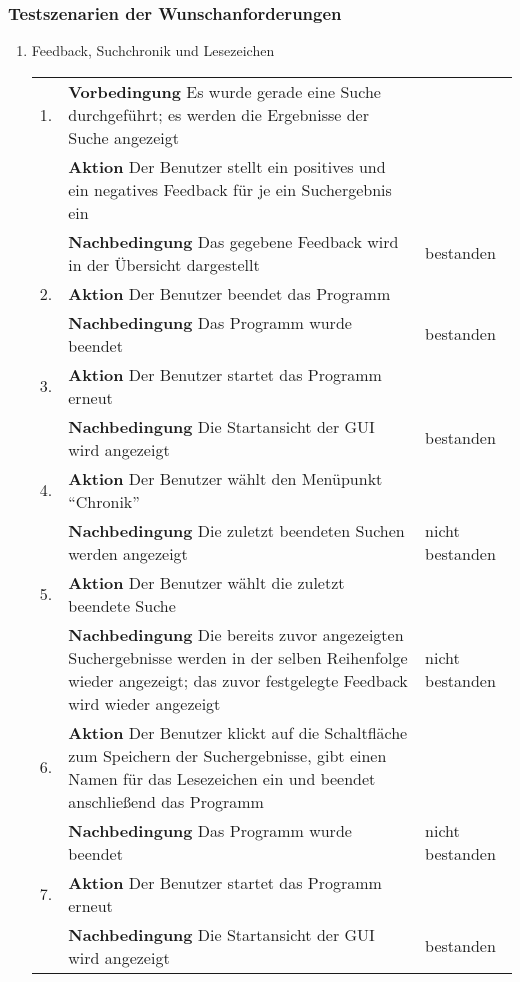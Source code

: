 \subsubsection{Testszenarien der Wunschanforderungen}
\begin{enumerate} [label=\bfseries /TSW \arabic*0/, leftmargin=*]
	\item Feedback, Suchchronik und Lesezeichen \newline \newline
	\begin{tabular}{rp{4in}|l}
	1. & \textbf{Vorbedingung} Es wurde gerade eine Suche durchgeführt; es werden die Ergebnisse der Suche angezeigt & \\
	   & \textbf{Aktion} Der Benutzer stellt ein positives und ein negatives Feedback für je ein Suchergebnis ein & \\
	   & \textbf{Nachbedingung} Das gegebene Feedback wird in der Übersicht dargestellt & bestanden \\
	\hline
	2. & \textbf{Aktion} Der Benutzer beendet das Programm & \\
	   & \textbf{Nachbedingung} Das Programm wurde beendet & bestanden \\
	\hline
	3. & \textbf{Aktion} Der Benutzer startet das Programm erneut & \\
	   & \textbf{Nachbedingung} Die Startansicht der GUI wird angezeigt & bestanden \\
	\hline	
	4. & \textbf{Aktion} Der Benutzer wählt den Menüpunkt \enquote{Chronik} & \\
	   & \textbf{Nachbedingung} Die zuletzt beendeten Suchen werden angezeigt & nicht bestanden \\
	\hline
	5. & \textbf{Aktion} Der Benutzer wählt die zuletzt beendete Suche & \\
	   & \textbf{Nachbedingung} Die bereits zuvor angezeigten Suchergebnisse werden in der selben Reihenfolge wieder angezeigt; das zuvor festgelegte Feedback wird wieder angezeigt & nicht bestanden \\
	\hline
	6. & \textbf{Aktion} Der Benutzer klickt auf die Schaltfläche zum Speichern der Suchergebnisse, gibt einen Namen für das Lesezeichen ein und beendet anschließend das Programm & \\
	   & \textbf{Nachbedingung} Das Programm wurde beendet & nicht bestanden \\
	\hline
	7. & \textbf{Aktion} Der Benutzer startet das Programm erneut & \\
	   & \textbf{Nachbedingung} Die Startansicht der GUI wird angezeigt & bestanden \\

\end{tabular}
\end{enumerate}
